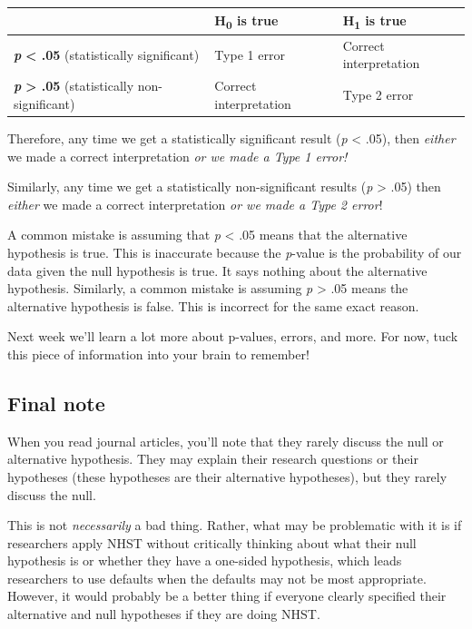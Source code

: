 \documentclass[
]{book}
\begin{document}
\begin{longtable}[]{@{}
  >{\raggedright\arraybackslash}p{}
  >{\raggedright\arraybackslash}p{}
  >{\raggedright\arraybackslash}p{}@{}}
\toprule
& H\textsubscript{0} is true & H\textsubscript{1} is true \\
\midrule
\endhead
\textbf{\emph{p}} \textbf{\textless{} .05} (statistically significant) & Type 1 error & Correct interpretation \\
\textbf{\emph{p}} \textbf{\textgreater{} .05} (statistically non-significant) & Correct interpretation & Type 2 error \\
\bottomrule
\end{longtable}

Therefore, any time we get a statistically significant result (\emph{p} \textless{} .05), then \emph{either} we made a correct interpretation \emph{or we made a Type 1 error!}

Similarly, any time we get a statistically non-significant results (\emph{p} \textgreater{} .05) then \emph{either} we made a correct interpretation \emph{or we made a Type 2 error}!

A common mistake is assuming that \emph{p} \textless{} .05 means that the alternative hypothesis is true. This is inaccurate because the \emph{p}-value is the probability of our data given the null hypothesis is true. It says nothing about the alternative hypothesis. Similarly, a common mistake is assuming \emph{p} \textgreater{} .05 means the alternative hypothesis is false. This is incorrect for the same exact reason.

Next week we'll learn a lot more about p-values, errors, and more. For now, tuck this piece of information into your brain to remember!

\hypertarget{final-note}{%
\subsection{Final note}\label{final-note}}

When you read journal articles, you'll note that they rarely discuss the null or alternative hypothesis. They may explain their research questions or their hypotheses (these hypotheses are their alternative hypotheses), but they rarely discuss the null.

This is not \emph{necessarily} a bad thing. Rather, what may be problematic with it is if researchers apply NHST without critically thinking about what their null hypothesis is or whether they have a one-sided hypothesis, which leads researchers to use defaults when the defaults may not be most appropriate. However, it would probably be a better thing if everyone clearly specified their alternative and null hypotheses if they are doing NHST.
\end{document}
